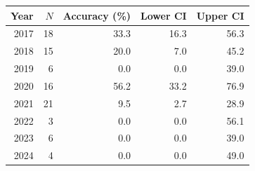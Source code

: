 \begin{tabular}{@{}rrrrr@{}}
\toprule
Year & $N$ & Accuracy (\%) & Lower CI & Upper CI \\
\midrule
2017 & 18 & 33.3 & 16.3 & 56.3 \\
2018 & 15 & 20.0 & 7.0 & 45.2 \\
2019 & 6 & 0.0 & 0.0 & 39.0 \\
2020 & 16 & 56.2 & 33.2 & 76.9 \\
2021 & 21 & 9.5 & 2.7 & 28.9 \\
2022 & 3 & 0.0 & 0.0 & 56.1 \\
2023 & 6 & 0.0 & 0.0 & 39.0 \\
2024 & 4 & 0.0 & 0.0 & 49.0 \\
\bottomrule
\end{tabular}
